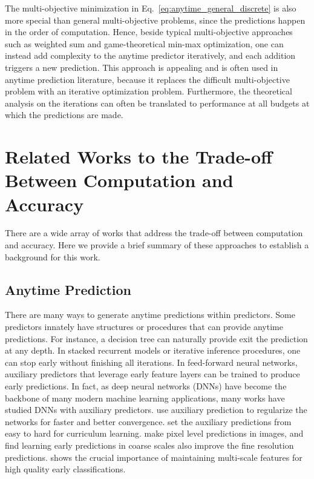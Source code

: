 The multi-objective minimization in Eq.~\ref{eq:anytime_general_discrete} is also more special than general
multi-objective problems, since the predictions happen in the order of computation. Hence, beside
typical multi-objective approaches such as weighted sum and game-theoretical min-max optimization, 
one can instead add complexity to the anytime predictor iteratively, and each addition triggers a new
prediction. This approach is appealing and is often used in anytime prediction literature, because 
it replaces the difficult multi-objective problem with an iterative optimization problem. Furthermore, 
the theoretical analysis on the iterations can often be translated to performance at all budgets at which
the predictions are made. 


\section{Related Works to the Trade-off Between Computation and Accuracy}

There are a wide array of works that address the trade-off between computation and accuracy. 
Here we provide a brief summary of these approaches to establish a background for this work.

\subsection{Anytime Prediction}
There are many ways to generate anytime predictions within predictors.
Some predictors innately have structures or procedures that can provide anytime predictions. 
For instance, a decision tree can naturally provide exit the prediction at any depth. 
In stacked recurrent models or iterative
inference procedures, one can stop early without finishing all iterations.
In feed-forward neural networks, auxiliary predictors that leverage
early feature layers can be trained to produce early predictions. 
In fact, as deep neural networks (DNNs) have become the backbone of many modern machine learning applications,
many works have studied DNNs with auxiliary predictors. 
\cite{supervisednet,inception_v4,pspnet,fractalnet} use auxiliary prediction to regularize the networks for faster and better convergence. 
\cite{curriculum,feedbacknet} set the auxiliary predictions from easy to hard for curriculum learning. 
\cite{hed,reverse_scene_seg} make pixel level predictions in images, and find learning early predictions in coarse scales also improve the fine resolution predictions. \cite{msdense} shows the crucial importance of maintaining multi-scale features for high quality early classifications. 

